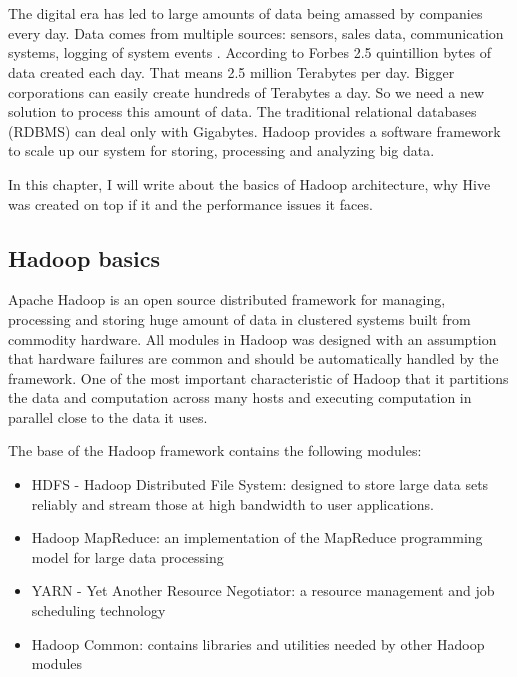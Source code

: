 \chapter{\bevezetes}


The digital era has led to large amounts of data being amassed by companies every day. Data comes from multiple sources: sensors, sales data, communication systems, logging of system events \etc. According to Forbes \cite{Forbes} 2.5 quintillion bytes of data created each day. That means 2.5 million Terabytes per day. Bigger corporations can easily create hundreds of Terabytes a day. So we need a new solution to process this amount of data. The traditional relational databases (RDBMS) can deal only with Gigabytes. Hadoop provides a software framework to scale up our system for storing, processing and analyzing big data.

In this chapter, I will write about the basics of Hadoop architecture, why Hive was created on top if it and the performance issues it faces.

\section{Hadoop basics}
Apache Hadoop is an open source distributed framework for managing, processing  and storing huge amount of data in clustered systems built from commodity hardware. All modules in Hadoop was designed with an assumption that hardware failures are common and should be automatically handled by the framework. One of the most important characteristic of Hadoop that it partitions the data and computation across many hosts and executing computation in parallel close to the data it uses.  \cite{Hadoop-wiki}

The base of the Hadoop framework contains the following modules:
\begin{itemize}
	\item HDFS - Hadoop Distributed File System: designed to store large data sets reliably and stream those at high bandwidth to user applications.
	\item Hadoop MapReduce: an implementation of the MapReduce programming model for large data processing
	\item YARN - Yet Another Resource Negotiator: a resource management and job scheduling technology
	\item Hadoop Common: contains libraries and utilities needed by other Hadoop modules
\end{itemize}

